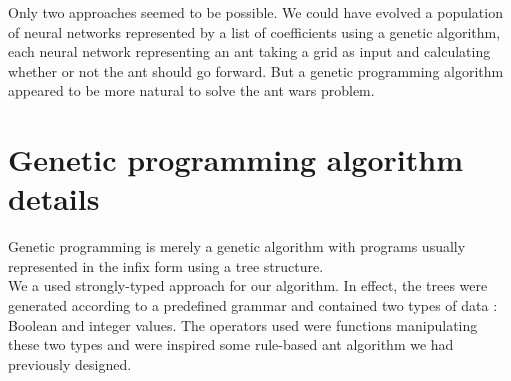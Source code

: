 \documentclass[10pt,a4paper]{article}
\begin{document}
Only two approaches seemed to be possible. We could have evolved a
population of neural networks represented by a list of coefficients
using a genetic algorithm, each neural network representing an ant
taking a grid as input and calculating whether or not the ant should go
forward. But a genetic programming algorithm appeared to be more
natural to solve the ant wars problem.

\section{Genetic programming algorithm details}

Genetic programming is merely a genetic algorithm with programs
usually represented in the infix form using a tree structure.\\

We a used strongly-typed approach for our algorithm. In effect, the
trees were generated according to a predefined grammar and contained
two types of data : Boolean and integer values. The operators used
were functions manipulating these two types and were inspired some
rule-based ant algorithm we had previously designed.\\
\end{document}

